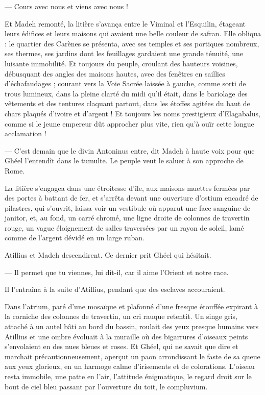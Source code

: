 \documentclass[a4paper, 11pt, oneside, polutonikogreek, french]{article}
\begin{document}
--- Cours avec nous et viens avec nous !

Et Madeh remonté, la litière s'avança entre le Viminal et l'Esquilin, étageant leurs édifices et leurs maisons qui avaient une belle couleur de safran. Elle obliqua : le quartier des Carènes se présenta, avec ses temples et ses portiques nombreux, ses thermes, ses jardins dont les feuillages gardaient une grande ténuité, une luisante immobilité. Et toujours du peuple, croulant des hauteurs voisines, débusquant des angles des maisons hautes, avec des fenêtres en saillies d'échafaudages ; courant vers la Voie Sacrée laissée à gauche, comme sorti de trous lumineux, dans la pleine clarté du midi qu'il était, dans le bariolage des vêtements et des tentures claquant partout, dans les étoffes agitées du haut de chars plaqués d'ivoire et d'argent ! Et toujours les noms prestigieux d'Elagabalus, comme si le jeune empereur dût approcher plus vite, rien qu'à ouïr cette longue acclamation !

--- C'est demain que le divin Antoninus entre, dit Madeh à haute voix pour que Ghéel l'entendît dans le tumulte. Le peuple veut le saluer à son approche de Rome.

La litière s'engagea dans une étroitesse d'île, aux maisons muettes fermées par des portes à battant de fer, et s'arrêta devant une ouverture d'ostium encadré de pilastres, qui s'ouvrit, laissa voir un vestibule où apparut une face sanguine de janitor, et, au fond, un carré chromé, une ligne droite de colonnes de travertin rouge, un vague éloignement de salles traversées par un rayon de soleil, lamé comme de l'argent dévidé en un large ruban.

Atillius et Madeh descendirent. Ce dernier prit Ghéel qui hésitait.

--- Il permet que tu viennes, lui dit-il, car il aime l'Orient et notre race.

Il l'entraîna à la suite d'Atillius, pendant que des esclaves accouraient.

Dans l'atrium, paré d'une mosaïque et plafonné d'une fresque étouffée expirant à la corniche des colonnes de travertin, un cri rauque retentit. Un singe gris, attaché à un autel bâti au bord du bassin, roulait des yeux presque humains vers Atillius et une ombre évoluait à la muraille où des bigarrures d'oiseaux peints s'envolaient en des nues bleues et roses. Et Ghéel, qui ne savait que dire et marchait précautionneusement, aperçut un paon arrondissant le faste de sa queue aux yeux glorieux, en un harmoge calme d'irisements et de colorations. L'oiseau resta immobile, une patte en l'air, l'attitude énigmatique, le regard droit sur le bout de ciel bleu passant par l'ouverture du toit, le compluvium.
\end{document}
